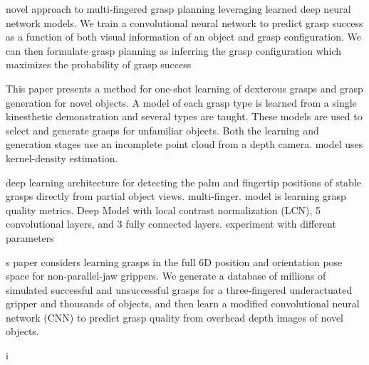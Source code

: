novel approach to multi-fingered grasp planning leveraging learned deep neural network models. We train a convolutional neural network to predict grasp success as a function of both visual information of an object and grasp configuration. We can then formulate grasp planning as inferring the grasp configuration which maximizes the probability of grasp success~\cite{luplanning}

This paper presents a method for one-shot learning of dexterous grasps and grasp generation for novel objects. A model of each grasp type is learned from a single kinesthetic demonstration and several types are taught. These models are used to select and generate grasps for unfamiliar objects. Both the learning and generation stages use an incomplete point cloud from a depth camera. model uses kernel-density estimation. ~\cite{kopicki2016one}

deep learning architecture
for detecting the palm and fingertip positions of stable grasps
directly from partial object views. multi-finger. model is learning grasp quality metrics. Deep Model with local contrast normalization (LCN), 5 convolutional layers, and 3 fully connected layers. experiment with different parameters~\cite{varley2015generating}

s paper considers learning grasps in the full 6D position and orientation pose space for non-parallel-jaw grippers. We generate a database of millions of simulated successful and unsuccessful grasps for a three-fingered underactuated gripper and thousands of objects, and then learn a modified convolutional neural network (CNN) to predict grasp quality from overhead depth images of novel objects.\cite{zhou20176dof}

i
